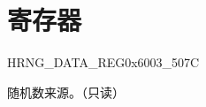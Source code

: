 \documentclass[main\_\_CN.tex]{subfiles}
\begin{document}
\section{寄存器}

\begin{register}{H}{RNG\_DATA\_REG}{0x6003\_507C}\label{regdesc:RNGDATAREG}
%
\regnewline%
\begin{regdesc}\begin{reglist}
\item [RNG\_DATA] 随机数来源。（只读）
\end{reglist}\end{regdesc}
\end{register}
\end{document}
